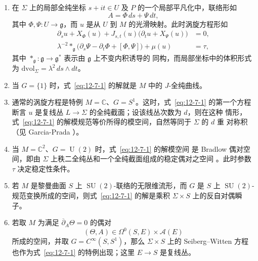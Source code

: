 \begin{remark}\label{rem:12-7-1}
\begin{enumerate}[label=(\roman*)]
\item 在 $\Sigma$ 上的局部全纯坐标 $s+it\in U$ 及 $P$ 的一个局部平凡化中，联络形如
\[
  A=\Phi\,ds+\Psi\,dt,
\]
其中 $\Phi,\Psi:U\to\mathfrak g$，而 $u$ 是从 $U$ 到 $M$ 的光滑映射。此时涡旋方程形如
\begin{equation}\label{eq:12-7-2}
\begin{aligned}
  \partial_su+X_\Phi(u)
  +J_{s,t}(u)\bigl(\partial_tu+X_\Psi(u)\bigr)&=0,\\
  \lambda^{-2}*_\mathfrak g
  \bigl(\partial_s\Psi-\partial_t\Phi+[\Phi,\Psi]\bigr)
  +\mu(u)&=\tau,
\end{aligned}
\end{equation}
其中 $*_\mathfrak g:\mathfrak g\to\mathfrak g^*$ 表示由 $\mathfrak g$ 上不变内积诱导的
同构，而局部坐标中的体积形式为
$\mathrm{dvol}_\Sigma=\lambda^2\,ds\wedge dt$。

\item 当 $G=\{1\}$ 时，式~\eqref{eq:12-7-1} 的解就是 $M$ 中的 $J$-全纯曲线。

\item 通常的涡旋方程是特例 $M=\mathbb C$、$G=S^1$。这时，式~\eqref{eq:12-7-1}
的第一个方程断言 $u$ 是复线丛 $L\to\Sigma$ 的全纯截面；设该线丛次数为 $d$，则在这种
情形，式~\eqref{eq:12-7-1} 的解模规范等价所得的模空间，自然等同于 $\Sigma$ 的 $d$ 重
对称积（见 Garcia-Prada ）。

\item 当 $M=\mathbb C^2$、$G=\operatorname{U}(2)$ 时，式~\eqref{eq:12-7-1} 的解模空间
是 Bradlow 偶对空间，即由 $\Sigma$ 上秩二全纯丛和一个全纯截面组成的稳定偶对之空间
。此时参数 $\tau$ 决定稳定性条件。

\item 若 $M$ 是黎曼曲面 $S$ 上 $\operatorname{SU}(2)$-联络的无限维流形，而 $G$ 是
$S$ 上 $\operatorname{SU}(2)$-规范变换所成的空间，则式~\eqref{eq:12-7-1} 的解是乘积
$\Sigma\times S$ 上的反自对偶瞬子。

\item 若取 $M$ 为满足 $\overline\partial_A\Theta=0$ 的偶对
\[
  (\Theta,A)\in\Omega^0(S,E)\times\mathcal A(E)
\]
所成的空间，并取 $G=C^\infty(S,S^1)$，那么 $\Sigma\times S$ 上的
Seiberg--Witten 方程也作为式~\eqref{eq:12-7-1} 的特例出现；这里 $E\to S$ 是复线丛。
\end{enumerate}
\end{remark}

